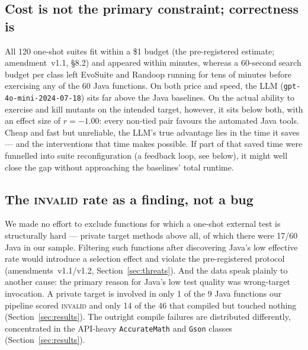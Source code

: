 \subsection{Cost is not the primary constraint; correctness is}
All 120 one-shot suites fit within a \$1 budget (the pre-registered estimate;
amendment~v1.1, \S8.2) and appeared within minutes, whereas a 60-second search budget per
class left EvoSuite and Randoop running for tens of minutes before exercising any of the
60 Java functions. On both price and speed, the LLM (\texttt{gpt-4o-mini-2024-07-18})
sits far above the Java baselines. On the actual ability to exercise and kill mutants on
the intended target, however, it sits below both, with an effect size of $r=-1.00$: every
non-tied pair favours the automated Java tools. Cheap and fast but unreliable, the LLM's
true advantage lies in the time it saves --- and the interventions that time makes
possible. If part of that saved time were funnelled into suite reconfiguration (a
feedback loop, see below), it might well close the gap without approaching the baselines'
total runtime.

\subsection{The \textsc{invalid} rate as a finding, not a bug}
We made no effort to exclude functions for which a one-shot external test is structurally
hard --- private target methods above all, of which there were 17/60 Java in our sample.
Filtering such functions after discovering Java's low effective rate would introduce a
selection effect and violate the pre-registered protocol (amendments~v1.1/v1.2,
Section~\ref{sec:threats}). And the data speak plainly to another cause: the primary
reason for Java's low test quality was wrong-target invocation. A private target is
involved in only 1 of the 9 Java functions our pipeline scored \textsc{invalid} and only 14
of the 46 that compiled but touched nothing (Section~\ref{sec:results}). The outright compile
failures are distributed differently, concentrated in the API-heavy \texttt{AccurateMath}
and \texttt{Gson} classes (Section~\ref{sec:results}).

